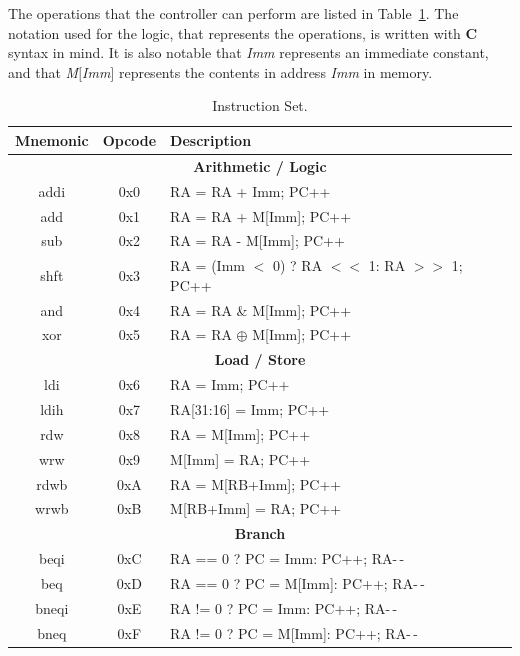 \documentclass[journal]{IEEEtran}
\begin{document}
The operations that the controller can perform are listed in
Table~\ref{tab:isa}.  The notation used for the logic, that represents the
operations, is written with {\bf C} syntax in mind.  It is also notable that
{\it Imm} represents an immediate constant, and that {\it M$[$Imm$]$} represents
the contents in address {\it Imm} in memory.

\begin{table}[!htbp]
  \centering
  \caption{Instruction Set.}
    \begin{tabular}{|c|c|l|}
    \hline
    {\bf Mnemonic} & {\bf Opcode} & {\bf Description} \\
    \hline \hline
\multicolumn{3}{|c|}{{\bf Arithmetic / Logic}}\\
\hline \hline
    addi  & 0x0 & RA = RA + Imm; PC++\\
    \hline
    add   & 0x1 & RA = RA + M[Imm]; PC++\\
    \hline
    sub   & 0x2 & RA = RA - M[Imm]; PC++\\
    \hline
    shft  & 0x3 & RA = (Imm {\tiny $<$} 0) ? RA {\tiny $<<$} 1: RA {\tiny $>>$} 1; PC++\\
    \hline
    and   & 0x4 & RA = RA \& M[Imm]; PC++\\
    \hline
    xor   & 0x5 & RA = RA $\oplus$ M[Imm]; PC++\\
    \hline
\multicolumn{3}{|c|}{{\bf Load / Store}}\\
\hline \hline
    ldi   & 0x6 & RA = Imm; PC++\\
    \hline
    ldih  & 0x7 & RA[31:16] = Imm; PC++\\
    \hline
    rdw   & 0x8 & RA = M[Imm]; PC++\\
    \hline
    wrw   & 0x9 & M[Imm] = RA; PC++\\
    \hline
    rdwb  & 0xA & RA = M[RB+Imm]; PC++\\
    \hline
    wrwb  & 0xB & M[RB+Imm] = RA; PC++\\
    \hline
\multicolumn{3}{|c|}{{\bf Branch}}\\
\hline \hline
    beqi  & 0xC & RA == 0 ? PC = Imm: PC++; RA-\,-\\
    \hline
    beq   & 0xD & RA == 0 ? PC = M[Imm]: PC++; RA-\,-\\
    \hline
    bneqi & 0xE & RA != 0 ? PC = Imm: PC++; RA-\,-\\
    \hline
    bneq  & 0xF & RA != 0 ? PC = M[Imm]: PC++; RA-\,-\\
    \hline

    \end{tabular}
  \label{tab:isa}
\end{table}
\end{document}
